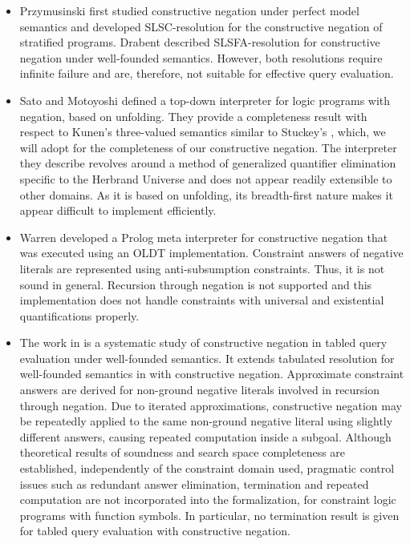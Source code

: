 \documentclass{tlp}
\begin{document}
\begin{itemize}

\item Przymusinski \cite{Przymusinski2} first studied constructive
negation under perfect model semantics and developed
SLSC-resolution for the constructive negation of stratified
programs. Drabent \cite{Drabent} described SLSFA-resolution for
constructive negation under well-founded semantics. However, both
resolutions require infinite failure and are, therefore, not suitable
for effective query evaluation.

\item Sato and Motoyoshi \cite{Sato91} defined a top-down interpreter
for logic programs with negation, based on unfolding. They provide a
completeness result with respect to Kunen's three-valued semantics
\cite{Kunen} similar to Stuckey's \cite{Stuckey95}, which, we
will adopt for the completeness of our constructive negation. The
interpreter they describe revolves around a method of generalized
quantifier elimination specific to the Herbrand Universe and does not
appear readily extensible to other domains. As it is based on
unfolding, its breadth-first nature makes it appear difficult to
implement efficiently.

\item Warren \cite{Warren92} developed a Prolog meta interpreter for
constructive negation that was executed using an OLDT
implementation. Constraint answers of negative literals are
represented using anti-subsumption constraints. Thus, it is not sound
in general. Recursion through negation is not supported and this
implementation does not handle constraints with universal and
existential quantifications properly.

\item The work in \cite{Damasio} is a systematic study of constructive
negation in tabled query evaluation under well-founded semantics. It
extends tabulated resolution for well-founded semantics in \cite{Bol}
with constructive negation. Approximate constraint answers are derived
for non-ground negative literals involved in recursion through
negation. Due to iterated approximations, constructive negation may be
repeatedly applied to the same non-ground negative literal using
slightly different answers, causing repeated computation inside a
subgoal. Although theoretical results of soundness and search space
completeness are established, independently of the constraint domain
used, pragmatic control issues such as redundant answer elimination,
termination and repeated computation are not incorporated into the
formalization, for constraint logic programs with function symbols. In
particular, no termination result is given for tabled query evaluation
with constructive negation.


\end{itemize}
\end{document}
